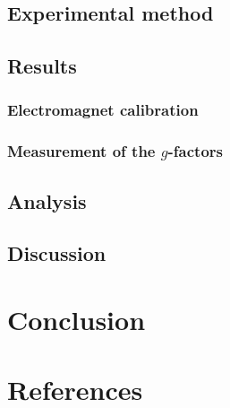 \documentclass[a4paper]{jpconf}
\numberwithin{equation}{section}
\begin{document}
\subsection{Experimental method}
\subsection{Results}
\subsubsection{Electromagnet calibration}
\subsubsection{Measurement of the $g$-factors}
\subsection{Analysis}

\subsection{Discussion}

\section{Conclusion}

\section*{References}
\begin{thebibliography}{9}
\end{thebibliography}
\end{document}
